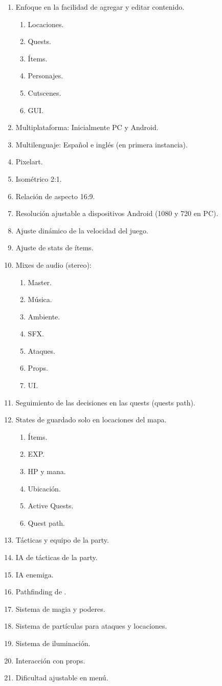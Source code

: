 \begin{enumerate}
	\item Enfoque en la facilidad de agregar y editar contenido.
	\begin{enumerate}
		\item Locaciones.
		\item Quests.
		\item Ítems.
		\item Personajes.
		\item Cutscenes.
		\item GUI.
	\end{enumerate}
	\item Multiplataforma: Inicialmente PC y Android.
	\item Multilenguaje: Español e inglés (en primera instancia).
	\item Pixelart.
	\item Isométrico 2:1.
	\item Relación de aspecto 16:9.
	\item Resolución ajustable a dispositivos Android (1080 y 720 en PC).
	\item Ajuste dinámico de la velocidad del juego.
	\item Ajuste de stats de ítems.
	\item Mixes de audio (stereo):
	\begin{enumerate}	
		\item Master.
		\item Música.
		\item Ambiente.
		\item SFX.
		\item Ataques.
		\item Props.
		\item UI.
	\end{enumerate}
	\item Seguimiento de las decisiones en las quests (quests path).
	\item States de guardado solo en locaciones del mapa.
	\begin{enumerate}
		\item Ítems.
		\item EXP.
		\item HP y mana.
		\item Ubicación.
		\item Active Quests.
		\item Quest path.
	\end{enumerate}
	\item Tácticas y equipo de la party.
	\item IA de tácticas de la party.
	\item IA enemiga.
	\item Pathfinding de .
	\item Sistema de magia y poderes.
	\item Sistema de partículas para ataques y locaciones.
	\item Sistema de iluminación.
	\item Interacción con props.
	\item Dificultad ajustable en menú.
\end{enumerate}

